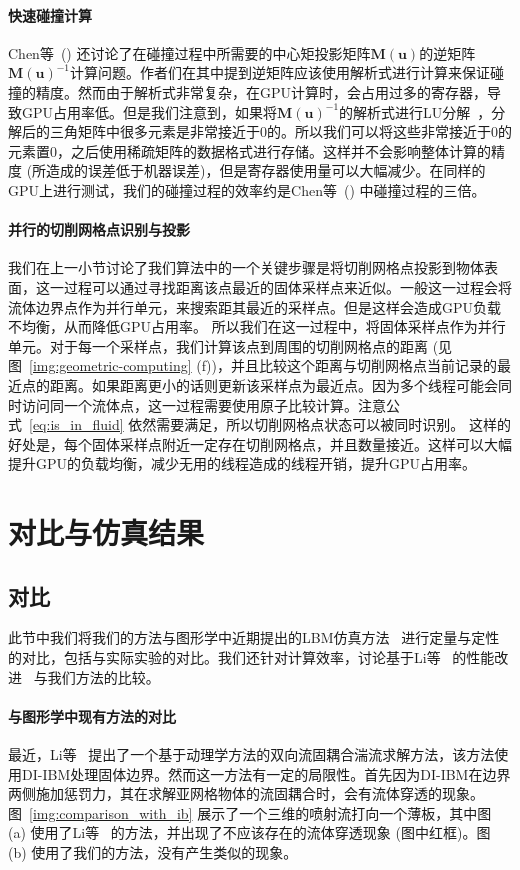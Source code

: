 \paragraph{快速碰撞计算}
Chen等~(\citeyear{Chen-2021}) 还讨论了在碰撞过程中所需要的中心矩投影矩阵$\bm{M}(\bm{u})$的逆矩阵$\bm{M}(\bm{u})^{-1}$计算问题。作者们在其中提到逆矩阵应该使用解析式进行计算来保证碰撞的精度。然而由于解析式非常复杂，在GPU计算时，会占用过多的寄存器，导致GPU占用率低。但是我们注意到，如果将$\bm{M}(\bm{u})^{-1}$的解析式进行LU分解~\cite{fei2018three}，分解后的三角矩阵中很多元素是非常接近于0的。所以我们可以将这些非常接近于0的元素置0，之后使用稀疏矩阵的数据格式进行存储。这样并不会影响整体计算的精度 (所造成的误差低于机器误差)，但是寄存器使用量可以大幅减少。在同样的GPU上进行测试，我们的碰撞过程的效率约是Chen等~(\citeyear{Chen-2021}) 中碰撞过程的三倍。

\paragraph{并行的切削网格点识别与投影}
我们在上一小节讨论了我们算法中的一个关键步骤是将切削网格点投影到物体表面，这一过程可以通过寻找距离该点最近的固体采样点来近似。一般这一过程会将流体边界点作为并行单元，来搜索距其最近的采样点。但是这样会造成GPU负载不均衡，从而降低GPU占用率。
所以我们在这一过程中，将固体采样点作为并行单元。对于每一个采样点，我们计算该点到周围的切削网格点的距离 (见图~\ref{img:geometric-computing} (f))，并且比较这个距离与切削网格点当前记录的最近点的距离。如果距离更小的话则更新该采样点为最近点。因为多个线程可能会同时访问同一个流体点，这一过程需要使用原子比较计算。注意公式~\ref{eq:is_in_fluid} 依然需要满足，所以切削网格点状态可以被同时识别。
这样的好处是，每个固体采样点附近一定存在切削网格点，并且数量接近。这样可以大幅提升GPU的负载均衡，减少无用的线程造成的线程开销，提升GPU占用率。

\section{对比与仿真结果}
\subsection{对比}
此节中我们将我们的方法与图形学中近期提出的LBM仿真方法~\cite{Li-2020} 进行定量与定性的对比，包括与实际实验的对比。我们还针对计算效率，讨论基于Li等~\citeyear{Li-2020} 的性能改进~\cite{Chen-2021} 与我们方法的比较。

\paragraph{与图形学中现有方法的对比}
最近，Li等~\citeyear{Li-2020} 提出了一个基于动理学方法的双向流固耦合湍流求解方法，该方法使用DI-IBM处理固体边界。然而这一方法有一定的局限性。首先因为DI-IBM在边界两侧施加惩罚力，其在求解亚网格物体的流固耦合时，会有流体穿透的现象。图~\ref{img:comparison_with_ib} 展示了一个三维的喷射流打向一个薄板，其中图 (a) 使用了Li等~\citeyear{Li-2020} 的方法，并出现了不应该存在的流体穿透现象 (图中红框)。图 (b) 使用了我们的方法，没有产生类似的现象。

